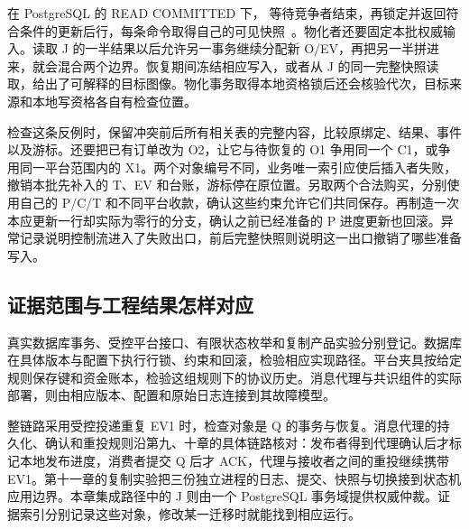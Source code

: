 在 PostgreSQL 的 READ COMMITTED 下， 等待竞争者结束，再锁定并返回符合条件的更新后行，每条命令取得自己的可见快照~\cite{pg}。物化者还要固定本批权威输入。读取 J 的一半结果以后允许另一事务继续分配新 O/EV，再把另一半拼进来，就会混合两个边界。恢复期间冻结相应写入，或者从 J 的同一完整快照读取，给出了可解释的目标图像。物化事务取得本地资格锁后还会核验代次，目标来源和本地写资格各自有检查位置。


检查这条反例时，保留冲突前后所有相关表的完整内容，比较原绑定、结果、事件以及游标。还要把已有订单改为 O2，让它与待恢复的 O1 争用同一个 C1，或争用同一平台范围内的 X1。两个对象编号不同，业务唯一索引应使后插入者失败，撤销本批先补入的 T、EV 和台账，游标停在原位置。另取两个合法购买，分别使用自己的 P/C/T 和不同平台收款，确认这些约束允许它们共同保存。再制造一次本应更新一行却实际为零行的分支，确认之前已经准备的 P 进度更新也回滚。异常记录说明控制流进入了失败出口，前后完整快照则说明这一出口撤销了哪些准备写入。

\subsection*{证据范围与工程结果怎样对应}

真实数据库事务、受控平台接口、有限状态枚举和复制产品实验分别登记。数据库在具体版本与配置下执行行锁、约束和回滚，检验相应实现路径。平台夹具按给定规则保存键和资金账本，检验这组规则下的协议历史。消息代理与共识组件的实际部署，则由相应版本、配置和原始日志连接到其故障模型。

整链路采用受控投递重复 EV1 时，检查对象是 Q 的事务与恢复。消息代理的持久化、确认和重投规则沿第九、十章的具体链路核对：发布者得到代理确认后才标记本地发布进度，消费者提交 Q 后才 ACK，代理与接收者之间的重投继续携带 EV1。第十一章的复制实验把三份独立进程的日志、提交、快照与切换接到状态机应用边界。本章集成路径中的 J 则由一个 PostgreSQL 事务域提供权威仲裁。证据索引分别记录这些对象，修改某一迁移时就能找到相应运行。
\FloatBarrier
